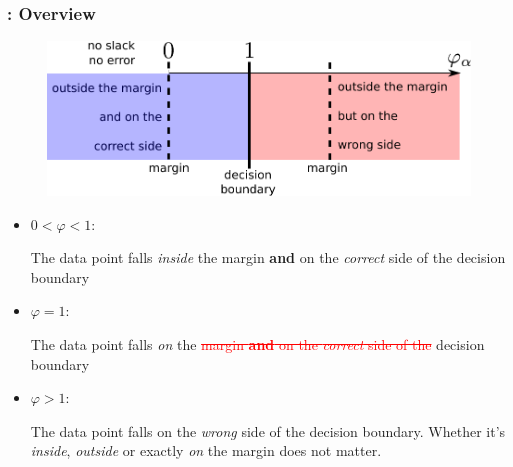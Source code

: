\begin{frame}\frametitle{\subsubsecname: Overview}

\begin{figure}[h]
	\centering
	\includegraphics[width=0.6\linewidth]{img/slack_values}%
    \label{fig:unconstrained}%
\end{figure}

\begin{itemize}
\item $0 < \varphi < 1$:

The data point falls \emph{inside} the margin \textbf{and} on the \emph{correct} side of the decision boundary 


\item $\varphi = 1$:

The data point falls \emph{on} the \textcolor{red}{\st{margin \textbf{and} on the \emph{correct} side of the}} decision boundary 


\item $\varphi > 1$:

The data point falls on the \emph{wrong} side of the decision boundary. Whether it's \emph{inside}, \emph{outside} or exactly \emph{on} the margin does not matter.

\end{itemize}

\end{frame}


